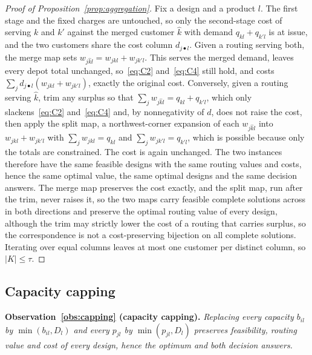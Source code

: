 \begin{proof}[Proof of Proposition~\ref{prop:aggregation}]
Fix a design and a product $l$. The first stage and the fixed
charges are
untouched, so only the second-stage cost of serving $k$ and $k'$ against
the merged customer $\hat k$ with demand $q_{kl}+q_{k'l}$ is at issue,
and the two customers share the cost column $d_{j\bullet l}$. Given a
routing serving both, the merge map sets
$w_{j\hat kl}=w_{jkl}+w_{jk'l}$. This serves
the merged demand, leaves every depot total unchanged, so~\eqref{eq:C2}
and~\eqref{eq:C4} still hold, and costs
$\sum_j d_{j\bullet l}(w_{jkl}+w_{jk'l})$, exactly the original cost.
Conversely, given a routing serving $\hat k$, trim any surplus so that
$\sum_j w_{j\hat kl}=q_{kl}+q_{k'l}$, which only slackens~\eqref{eq:C2}
and~\eqref{eq:C4} and, by nonnegativity of $d$, does not raise the cost,
then apply the split map, a
northwest-corner expansion of each $w_{j\hat kl}$ into $w_{jkl}+w_{jk'l}$ with
$\sum_j w_{jkl}=q_{kl}$ and $\sum_j w_{jk'l}=q_{k'l}$, which is possible
because only the totals are constrained. The cost is again unchanged.
The two instances therefore have the same feasible designs with the same
routing values and costs, hence the same optimal value, the same
optimal designs and the same decision answers. The merge map preserves
the cost exactly, and the split map, run after the trim, never raises
it, so the two maps carry feasible complete solutions across in both
directions and preserve the optimal routing value of every design,
although the trim may strictly lower the cost of a routing that
carries surplus, so the correspondence is not a cost-preserving
bijection on all complete solutions. Iterating over
equal columns leaves at most one customer per
distinct column, so $|K|\le\tau$.
\end{proof}

\subsection{Capacity capping}\label{app:cap}

\noindent
\textbf{Observation~\ref{obs:capping} (capacity capping).}
\emph{Replacing every capacity $b_{il}$ by $\min(b_{il},D_l)$ and every
$p_{jl}$ by $\min(p_{jl},D_l)$ preserves feasibility, routing value and
cost of every design, hence the optimum and both decision answers.}

